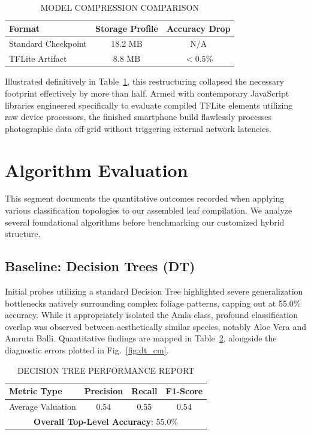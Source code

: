 \documentclass[conference]{IEEEtran}
\begin{document}
\begin{table}[htbp]
\caption{MODEL COMPRESSION COMPARISON}
\label{tab:tflite_compression}
\centering
\begin{tabular}{|l|c|c|}
\hline
\textbf{Format} & \textbf{Storage Profile} & \textbf{Accuracy Drop} \\
\hline
Standard Checkpoint & 18.2 MB & N/A \\
TFLite Artifact & 8.8 MB & $<0.5\%$ \\
\hline
\end{tabular}
\end{table}

Illustrated definitively in Table~\ref{tab:tflite_compression}, this restructuring collapsed the necessary footprint effectively by more than half. Armed with contemporary JavaScript libraries engineered specifically to evaluate compiled TFLite elements utilizing raw device processors, the finished smartphone build flawlessly processes photographic data off-grid without triggering external network latencies.

\section{Algorithm Evaluation}

This segment documents the quantitative outcomes recorded when applying various classification topologies to our assembled leaf compilation. We analyze several foundational algorithms before benchmarking our customized hybrid structure.

\subsection{Baseline: Decision Trees (DT)}
Initial probes utilizing a standard Decision Tree highlighted severe generalization bottlenecks natively surrounding complex foliage patterns, capping out at 55.0\% accuracy. While it appropriately isolated the Amla class, profound classification overlap was observed between aesthetically similar species, notably Aloe Vera and Amruta Balli. Quantitative findings are mapped in Table~\ref{tab:dt_report}, alongside the diagnostic errors plotted in Fig.~\ref{fig:dt_cm}.

\begin{table}[htbp]
\caption{DECISION TREE PERFORMANCE REPORT}
\label{tab:dt_report}
\centering
\begin{tabular}{|l|c|c|c|}
\hline
\textbf{Metric Type} & \textbf{Precision} & \textbf{Recall} & \textbf{F1-Score} \\
\hline
Average Valuation & 0.54 & 0.55 & 0.54 \\
\hline
\multicolumn{4}{|c|}{\textbf{Overall Top-Level Accuracy}: 55.0\%} \\
\hline
\end{tabular}
\end{table}
\end{document}
